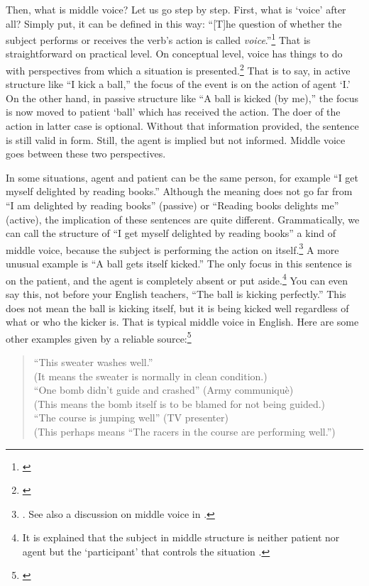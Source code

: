 Then, what is middle voice? Let us go step by step. First, what is `voice' after all? Simply put, it can be defined in this way: ``[T]he question of whether the subject performs or receives the verb's action is called \emph{voice}.''\footnote{\citealp[p.~105]{fairbairn:understanding}} That is straightforward on practical level. On conceptual level, voice has things to do with perspectives from which a situation is presented.\footnote{\citealp[p.~466]{brownmiller:dict}} That is to say, in active structure like ``I kick a ball,'' the focus of the event is on the action of agent `I.' On the other hand, in passive structure like ``A ball is kicked (by me),'' the focus is now moved to patient `ball' which has received the action. The doer of the action in latter case is optional. Without that information provided, the sentence is still valid in form. Still, the agent is implied but not informed. Middle voice goes between these two perspectives.

In some situations, agent and patient can be the same person, for example ``I get myself delighted by reading books.'' Although the meaning does not go far from ``I am delighted by reading books'' (passive) or ``Reading books delights me'' (active), the implication of these sentences are quite different. Grammatically, we can call the structure of ``I get myself delighted by reading books'' a kind of middle voice, because the subject is performing the action on itself.\footnote{\citealp[p.~114]{fairbairn:understanding}. See also a discussion on middle voice in \citealp[pp.~105--6]{pinker:stuff}.} A more unusual example is ``A ball gets itself kicked.'' The only focus in this sentence is on the patient, and the agent is completely absent or put aside.\footnote{It is explained that the subject in middle structure is neither patient nor agent but the `participant' that controls the situation \citep[pp.~466--7]{brownmiller:dict}.} You can even say this, not before your English teachers, ``The ball is kicking perfectly.'' This does not mean the ball is kicking itself, but it is being kicked well regardless of what or who the kicker is. That is typical middle voice in English. Here are some other examples given by a reliable source:\footnote{\citealp[p.~466]{brownmiller:dict}} 

\begin{quote}
``This sweater washes well.''\\
(It means the sweater is normally in clean condition.)\\[1.5mm]
``One bomb didn't guide and crashed'' (Army communiqu\`e)\\
(This means the bomb itself is to be blamed for not being guided.)\\[1.5mm]
``The course is jumping well'' (TV presenter)\\
(This perhaps means ``The racers in the course are performing well.'')
\end{quote}

